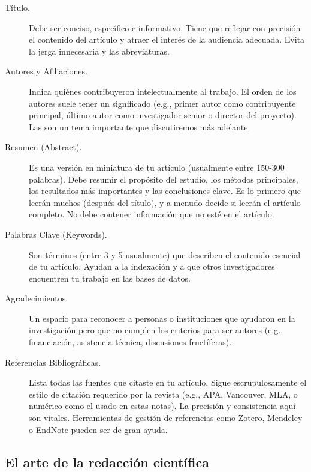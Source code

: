 \begin{description}
	\item[Título.] Debe ser conciso, específico e informativo.
	      Tiene que reflejar con precisión el contenido del artículo y atraer el interés de la audiencia adecuada.
	      Evita la jerga innecesaria y las abreviaturas.

	\item[Autores y Afiliaciones.] Indica quiénes contribuyeron intelectualmente al trabajo.
	      El orden de los autores suele tener un significado (e.g., primer autor como contribuyente principal, último autor como investigador senior o director del proyecto).
	      Las  son un tema importante que discutiremos más adelante.

	\item[Resumen (Abstract).] Es una versión en miniatura de tu artículo (usualmente entre 150-300 palabras).
	      Debe resumir el propósito del estudio, los métodos principales, los resultados más importantes y las conclusiones clave.
	      Es lo primero que leerán muchos (después del título), y a menudo decide si leerán el artículo completo.
	      No debe contener información que no esté en el artículo.

	\item[Palabras Clave (Keywords).] Son términos (entre 3 y 5 usualmente) que describen el contenido esencial de tu artículo.
	      Ayudan a la indexación y a que otros investigadores encuentren tu trabajo en las bases de datos.

	\item[Agradecimientos.] Un espacio para reconocer a personas o instituciones que ayudaron en la investigación pero que no cumplen los criterios para ser autores (e.g., financiación, asistencia técnica, discusiones fructíferas).

	\item[Referencias Bibliográficas.] Lista todas las fuentes que citaste en tu artículo.
	      Sigue escrupulosamente el estilo de citación requerido por la revista (e.g., APA, Vancouver, MLA, o numérico como el usado en estas notas).
	      La precisión y consistencia aquí son vitales.
	      Herramientas de gestión de referencias como Zotero, Mendeley o EndNote pueden ser de gran ayuda.
\end{description}

\subsection*{El arte de la redacción científica}
\label{sub:redaccionclara}


